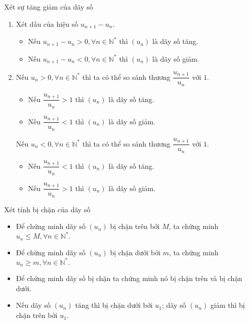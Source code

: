 \begin{dang}{Xét sự tăng giảm của dãy số}
	
	\begin{enumerate}[\iconMT]
		\item {} Xét dấu của hiệu số $u_{n+1}-u_n$.
		\begin{itemize}
			\item Nếu $u_{n+1}-u_n>0, \forall n \in \mathbb{N}^*$ thì $(u_n)$ là dãy số tăng.
			\item Nếu $u_{n+1}-u_n<0, \forall n \in \mathbb{N}^*$ thì $(u_n)$ là dãy số giảm.
		\end{itemize}
		\item {} Nếu $u_n>0, \forall n\in \mathbb{N}^*$ thì ta có thể so sánh thương $\dfrac{u_{n+1}}{u_n}$ với $1$.
		\begin{itemize}
			\item Nếu $\dfrac{u_{n+1}}{u_n}>1$ thì $(u_n)$ là dãy số tăng.
			\item Nếu $\dfrac{u_{n+1}}{u_n}<1$ thì $(u_n)$ là dãy số giảm.
		\end{itemize}
		Nếu $u_n<0, \forall n\in \mathbb{N}^*$ thì ta có thể so sánh thương $\dfrac{u_{n+1}}{u_n}$ với $1$.
		\begin{itemize}
			\item Nếu $\dfrac{u_{n+1}}{u_n}<1$ thì $(u_n)$ là dãy số tăng.
			\item Nếu $\dfrac{u_{n+1}}{u_n}>1$ thì $(u_n)$ là dãy số giảm.
		\end{itemize}
	\end{enumerate}
\end{dang}

\begin{dang}{Xét tính bị chặn của dãy số}
	\begin{itemize}
		\item Để chứng minh dãy số $(u_n)$ bị chặn trên bởi $M$, ta chứng minh $u_n\leq M, \forall n\in \mathbb{N}^*.$
		\item Để chứng minh dãy số $(u_n)$ bị chặn dưới bởi $m$, ta chứng minh $u_n\geq m, \forall n\in \mathbb{N}^*.$
		\item Để chứng minh dãy số bị chặn ta chứng minh nó bị chặn trên và bị chặn dưới.
		\item Nếu dãy số $(u_n)$ tăng thì bị chặn dưới bởi $u_1$; dãy số $(u_n)$ giảm thì bị chặn trên bởi $u_1$.
	\end{itemize}
\end{dang}

